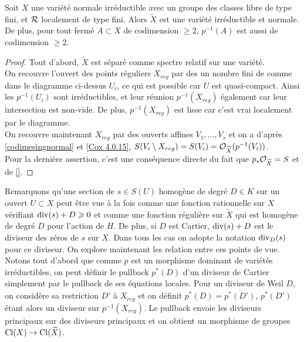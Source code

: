 \begin{prop}
Soit $X$ une variété normale irréductible avec un groupe des classes libre de type fini, et $\mathcal{R}$ localement de type fini. Alors $\widetilde{X}$ est une variété irréductible et normale. De plus, pour tout fermé $A\subset X$ de codimension $\geq 2$, $p^{-1}(A)$ est aussi de codimension $\geq 2$.
\end{prop}
\begin{proof}
Tout d'abord, $\widetilde{X}$ est séparé comme spectre relatif sur une variété.\\
On recouvre l'ouvert des points réguliers $X_{reg}$ par des un nombre fini de comme dans le diagramme ci-dessus $U_i$, ce qui est possible car $U$ est quasi-compact. Ainsi les $p^{-1}(U_i)$ sont irréductibles, et leur réunion $p^{-1}(X_{reg})$ également car leur intersection est non-vide. De plus, $p^{-1}(X_{reg})$ est lisse car c'est vrai localement par le diagramme.\\
On recouvre maintenant $X_{reg}$ par des ouverts affines $V_1,...,V_s$ et on a d'après \ref{codimesingnormal} et \ref{Cox 4.0.15}, $S(V_i\setminus X_{reg})=S(V_i)=\mathcal{O}_{\widetilde{X}}(p^{-1}(V_i))$.\\
Pour la dernière assertion, c'est une conséquence directe du fait que $p_*\mathcal{O}_{\widetilde{X}}=S$ et de \ref{}.
\end{proof}

Remarquons qu'une section de $s\in S(U)$ homogène de degré $D\in K$ sur un ouvert $U\subset X$ peut être vue à la fois comme une fonction rationnelle sur $X$ vérifiant $\operatorname{div}(s)+D\geqslant 0$ et comme une fonction régulière sur $\widetilde{X}$ qui est homogène de degré $D$ pour l'action de $H$. De plus, si $D$ est Cartier, $\operatorname{div}(s)+D$ est le diviseur des zéros de $s$ sur $X$. Dans tous les cas on adopte la notation $\operatorname{div}_D(s)$ pour ce diviseur. On explore maintenant les relation entre ces points de vue. Notons tout d'abord que comme $p$ est un morphisme dominant de variétés irréductibles, on peut définir le pullback $p^*(D)$ d'un diviseur de Cartier simplement par le pullback de ses équations locales. Pour un diviseur de Weil $D$, on considère sa restriction $D'$ à $X_{reg}$ et on définit $p^*(D)=\overline{p^*(D')}$, $p^*(D')$ étant alors un diviseur sur $p^{-1}(X_{reg})$. Le pullback envoie les diviseurs principaux sur des diviseurs principaux et on obtient un morphisme de groupes $\operatorname{Cl}(X)\rightarrow \operatorname{Cl}(\widetilde{X})$.

